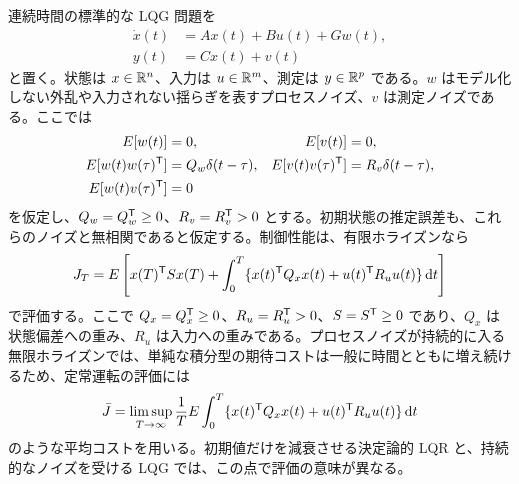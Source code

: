 連続時間の標準的な LQG 問題を
\begin{align}
  \dot{x}(t)&=Ax(t)+Bu(t)+Gw(t),\\
  y(t)&=Cx(t)+v(t)
  \label{eq:lqg-plant}
\end{align}
と置く。状態は $x\in\mathbb{R}^n$、入力は $u\in\mathbb{R}^m$、測定は $y\in\mathbb{R}^p$ である。$w$ はモデル化しない外乱や入力されない揺らぎを表すプロセスノイズ、$v$ は測定ノイズである。ここでは
\begin{align}
  E[w(t)]&=0,
  &E[v(t)]&=0,\\
  E[w(t)w(\tau)^{\mathsf{T}}]&=Q_w\delta(t-\tau),
  &E[v(t)v(\tau)^{\mathsf{T}}]&=R_v\delta(t-\tau),\\
  E[w(t)v(\tau)^{\mathsf{T}}]&=0
\end{align}
を仮定し、$Q_w=Q_w^{\mathsf{T}}\ge0$、$R_v=R_v^{\mathsf{T}}>0$ とする。初期状態の推定誤差も、これらのノイズと無相関であると仮定する。制御性能は、有限ホライズンなら
\begin{equation}
  J_T
  =E\left[
    x(T)^{\mathsf{T}} S x(T)
    +\int_0^T
      \{x(t)^{\mathsf{T}} Q_x x(t)+u(t)^{\mathsf{T}} R_u u(t)\}\,\mathrm{d} t
  \right]
  \label{eq:lqg-finite-cost}
\end{equation}
で評価する。ここで $Q_x=Q_x^{\mathsf{T}}\ge0$、$R_u=R_u^{\mathsf{T}}>0$、$S=S^{\mathsf{T}}\ge0$ であり、$Q_x$ は状態偏差への重み、$R_u$ は入力への重みである。プロセスノイズが持続的に入る無限ホライズンでは、単純な積分型の期待コストは一般に時間とともに増え続けるため、定常運転の評価には
\begin{equation}
  \bar{J}
  =
  \limsup_{T\to\infty}
  \frac{1}{T}
  E\int_0^T
    \{x(t)^{\mathsf{T}} Q_x x(t)+u(t)^{\mathsf{T}} R_u u(t)\}\,\mathrm{d} t
  \label{eq:lqg-average-cost}
\end{equation}
のような平均コストを用いる。初期値だけを減衰させる決定論的 LQR と、持続的なノイズを受ける LQG では、この点で評価の意味が異なる。

